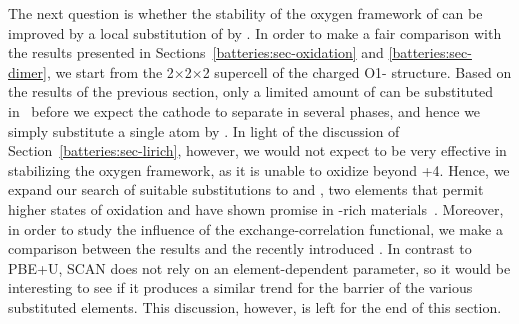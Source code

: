 \begin{refsection}
The next question is whether the stability of the oxygen framework of 
 can be improved by a local substitution of  by . In order 
to make a fair comparison with the results presented in 
Sections~\ref{batteries:sec-oxidation} and \ref{batteries:sec-dimer}, we start 
from the 2$\times$2$\times$2 supercell of the charged O1- structure. Based 
on the results of the previous section, only a limited amount of  can 
be substituted in~ before we expect the cathode to separate in several 
phases, and hence we simply substitute a single  atom by . In 
light of the discussion of Section~\ref{batteries:sec-lirich},  however, we 
would not expect  to be very effective in stabilizing the oxygen 
framework, as it is unable to oxidize beyond +4. Hence, we expand our search 
of suitable substitutions to  and , two elements that permit 
higher states of oxidation and have shown promise in -rich 
materials~\cite{Ma2014, Xiao2012}. Moreover, in order to study the influence of 
the exchange-correlation functional, we make a comparison between the  results and the 
recently introduced . 
In contrast to \gls{PBE}+U, \gls{SCAN} does not rely on an element-dependent parameter, 
so it would be interesting to see if it produces a similar trend for the 
barrier of the various substituted elements.
This discussion, however, is left for the end of this section.
 

\end{refsection}
